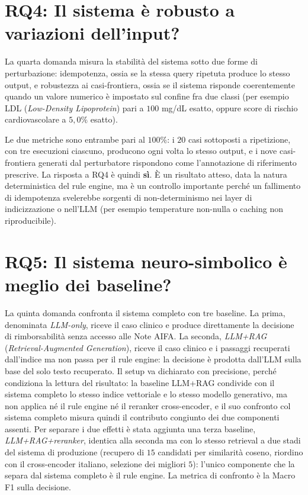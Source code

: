 \section{RQ4: Il sistema è robusto a variazioni dell'input?}
\label{sec:rq4}

La quarta domanda misura la stabilità del sistema sotto due forme di perturbazione: idempotenza, ossia se la stessa query ripetuta produce lo stesso output, e robustezza ai casi-frontiera, ossia se il sistema risponde coerentemente quando un valore numerico è impostato sul confine fra due classi (per esempio LDL (\emph{Low-Density Lipoprotein}) pari a $100$ mg/dL esatto, oppure score di rischio cardiovascolare a $5{,}0\%$ esatto).

Le due metriche sono entrambe pari al $100\%$: i $20$ casi sottoposti a ripetizione, con tre esecuzioni ciascuno, producono ogni volta lo stesso output, e i nove casi-frontiera generati dal perturbatore rispondono come l'annotazione di riferimento prescrive. La risposta a RQ4 è quindi \textbf{sì}. È un risultato atteso, data la natura deterministica del rule engine, ma è un controllo importante perché un fallimento di idempotenza svelerebbe sorgenti di non-determinismo nei layer di indicizzazione o nell'LLM (per esempio temperature non-nulla o caching non riproducibile).

\section{RQ5: Il sistema neuro-simbolico è meglio dei baseline?}
\label{sec:rq5}

La quinta domanda confronta il sistema completo con tre baseline. La prima, denominata \emph{LLM-only}, riceve il caso clinico e produce direttamente la decisione di rimborsabilità senza accesso alle Note AIFA. La seconda, \emph{LLM+RAG} (\emph{Retrieval-Augmented Generation}), riceve il caso clinico e i passaggi recuperati dall'indice ma non passa per il rule engine: la decisione è prodotta dall'LLM sulla base del solo testo recuperato. Il setup va dichiarato con precisione, perché condiziona la lettura del risultato: la baseline LLM+RAG condivide con il sistema completo lo stesso indice vettoriale e lo stesso modello generativo, ma non applica né il rule engine né il reranker cross-encoder, e il suo confronto col sistema completo misura quindi il contributo congiunto dei due componenti assenti. Per separare i due effetti è stata aggiunta una terza baseline, \emph{LLM+RAG+reranker}, identica alla seconda ma con lo stesso retrieval a due stadi del sistema di produzione (recupero di $15$ candidati per similarità coseno, riordino con il cross-encoder italiano, selezione dei migliori $5$): l'unico componente che la separa dal sistema completo è il rule engine. La metrica di confronto è la Macro F1 sulla decisione.

